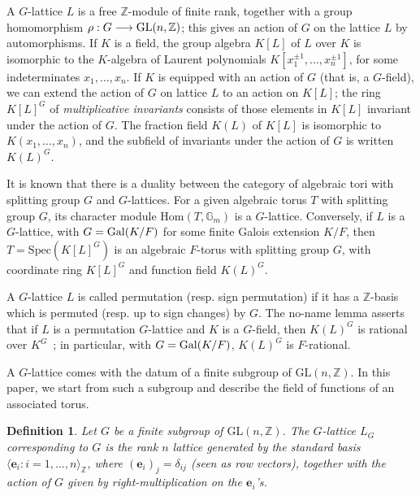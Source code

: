 \documentclass[12pt]{article}
\theoremstyle{plain}
\newtheorem{definition}[theorem]{Definition}
\newcommand{\Z}{\ensuremath{\mathbb{Z}}}
\begin{document}
A $G$-lattice $L$ is a free $\Z$-module of finite rank, together with
a group homomorphism $\rho: G \longrightarrow {\rm GL}(n,\Z)$; this
gives an action of $G$ on the lattice $L$ by automorphisms.  If $K$ is
a field, the group algebra $K[L]$ of $L$ over $K$ is isomorphic to the
$K$-algebra of Laurent polynomials $K[x_1^{\pm 1},\dots,x_n^{\pm 1}]$,
for some indeterminates $x_1,\dots,x_n$.  If $K$ is equipped with an
action of $G$ (that is, a $G$-field), we can extend the action of $G$
on lattice $L$ to an action on $K[L]$; the ring $K[L]^G$ of {\em
  multiplicative invariants} consists of those elements in $K[L]$
invariant under the action of $G$. The fraction field $K(L)$ of $K[L]$
is isomorphic to $K(x_1,\dots,x_n)$, and the subfield of
invariants under the action of $G$ is written $K(L)^G$.

It is known that there is a duality between the category of algebraic
tori with splitting group $G$ and $G$-lattices. For a given algebraic
torus $T$ with splitting group $G$, its character module
$\mathrm{Hom}(T,\mathbb{G}_m)$ is a $G$-lattice. Conversely, if $L$ is
a $G$-lattice, with $G={\rm Gal}(K/F)$ for some finite Galois
extension $K/F$, then $T=\mathrm{Spec}(K[L]^G)$ is an algebraic
$F$-torus with splitting group $G$, with coordinate ring $K[L]^G$ and
function field $K(L)^G$.

A $G$-lattice $L$ is called permutation (resp. sign permutation) if it
has a $\Z$-basis which is permuted (resp. up to sign changes) by
$G$. The no-name lemma asserts that if $L$ is a permutation
$G$-lattice and $K$ is a $G$-field, then $K(L)^G$ is rational over
$K^G$~\cite{Lenstra,Domokos}; in particular, with $G={\rm Gal}(K/F)$,
$K(L)^G$ is $F$-rational.

A $G$-lattice comes with the datum of a finite subgroup of
$\mathrm{GL}(n,\Z)$. In this paper, we start from such a subgroup and
describe the field of functions of an associated torus.


\begin{definition}\label{Assumption}
  Let $G$ be a finite subgroup of $\mathrm{GL}(n,\Z)$.
  The $G$-lattice $L_G$ corresponding to $G$ is the rank $n$ lattice
  generated by the standard basis $ \langle \textbf{e}_i : i = 1,
  \ldots, n \rangle_\Z$, where $(\textbf{e}_i)_j = \delta_{ij}$ (seen
  as row vectors), together with the action of $G$ given by
  right-multiplication on the $\textbf{e}_i$'s.  
\end{definition}
\end{document}

